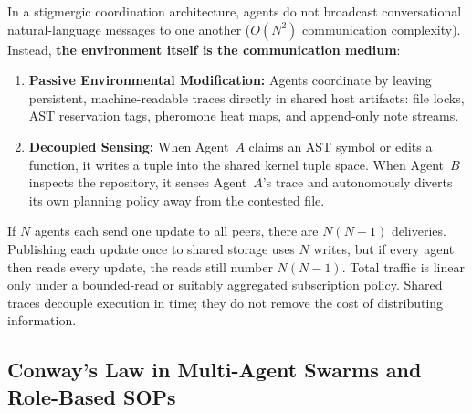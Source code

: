 \documentclass[11pt,a4paper]{article}
\providecommand{\pdmarginfigure}[2]{}
\begin{document}
\pdmarginfigure{termites}{Cathedral termite mound (\emph{Nasutitermes triodiae}) in Litchfield National Park, Australia. Social insects construct massive architectural edifices through stigmergic environmental modification without central coordination or peer-to-peer communication.}%
In a stigmergic coordination architecture, agents do not broadcast conversational natural-language messages to one another ($O(N^2)$ communication complexity). Instead, \textbf{the environment itself is the communication medium}:
\begin{enumerate}[leftmargin=1.8em,itemsep=2pt]
  \item \textbf{Passive Environmental Modification:} Agents coordinate by leaving persistent, machine-readable traces directly in shared host artifacts: file locks, AST reservation tags, pheromone heat maps, and append-only note streams.
  \item \textbf{Decoupled Sensing:} When Agent~$A$ claims an AST symbol or edits a function, it writes a tuple into the shared kernel tuple space. When Agent~$B$ inspects the repository, it senses Agent~$A$'s trace and autonomously diverts its own planning policy away from the contested file.
\end{enumerate}

If $N$ agents each send one update to all peers, there are $N(N-1)$ deliveries. Publishing each update once to shared storage uses $N$ writes, but if every agent then reads every update, the reads still number $N(N-1)$. Total traffic is linear only under a bounded-read or suitably aggregated subscription policy. Shared traces decouple execution in time; they do not remove the cost of distributing information.

\subsection{Conway's Law in Multi-Agent Swarms and Role-Based SOPs}
\end{document}
